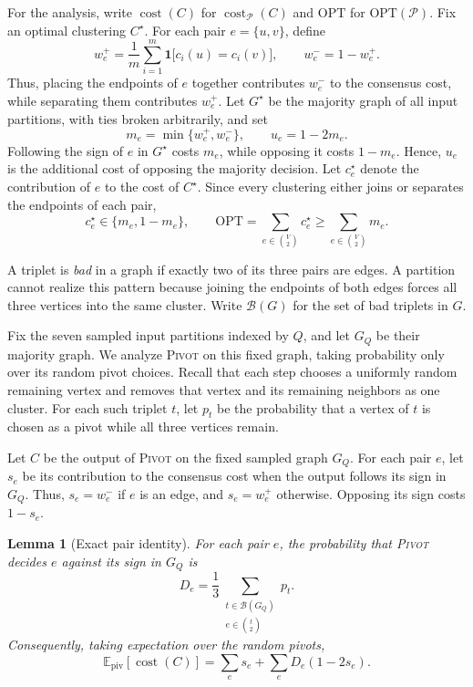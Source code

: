 \documentclass[11pt]{article}
\newtheorem{lemma}[theorem]{Lemma}
\theoremstyle{definition}
\theoremstyle{remark}
\newcommand{\1}{\mathbf{1}}
\begin{document}
For the analysis, write $\operatorname{cost}(C)$ for
$\operatorname{cost}_{\mathcal{P}}(C)$ and $\mathrm{OPT}$ for
$\mathrm{OPT}(\mathcal{P})$. Fix an optimal clustering $C^\star$. For each pair $e=\{u,v\}$, define
\[
    w_e^+
    = \frac{1}{m}\sum_{i=1}^{m}
      \mathbf{1}\bigl[c_i(u)=c_i(v)\bigr],
    \qquad
    w_e^- = 1-w_e^+.
\]
Thus, placing the endpoints of $e$ together contributes $w_e^-$
to the consensus cost, while separating them contributes $w_e^+$. Let $G^\star$ be the majority graph of all input partitions,
with ties broken arbitrarily, and set
\[
    m_e=\min\{w_e^+,w_e^-\},
    \qquad
    u_e=1-2m_e.
\]
Following the sign of $e$ in $G^\star$ costs $m_e$, while
opposing it costs $1-m_e$. Hence, $u_e$ is the additional cost
of opposing the majority decision. Let $c_e^\star$ denote the contribution of $e$ to the cost of
$C^\star$. Since every clustering either joins or separates
the endpoints of each pair,
\[
    c_e^\star\in\{m_e,1-m_e\},
    \qquad
    \mathrm{OPT}
    =\sum_{e\in\binom{V}{2}}c_e^\star
    \geq \sum_{e\in\binom{V}{2}}m_e.
\]

A triplet is \emph{bad} in a graph if exactly two of its three
pairs are edges. A partition cannot realize this pattern because
joining the endpoints of both edges forces all three vertices
into the same cluster. Write $\mathcal B(G)$ for the set of
bad triplets in $G$.

Fix the seven sampled input partitions indexed by $Q$, and let
$G_Q$ be their majority graph. We analyze \textsc{Pivot} on this
fixed graph, taking probability only over its random pivot choices.
Recall that each step chooses a uniformly random remaining vertex
and removes that vertex and its remaining neighbors as one cluster.
For each such triplet $t$, let $p_t$ be the probability that
a vertex of $t$ is chosen as a pivot while all three vertices remain.

Let $C$ be the output of \textsc{Pivot} on the fixed sampled graph
$G_Q$. For each pair $e$, let $s_e$ be its contribution to the
consensus cost when the output follows its sign in $G_Q$.
Thus, $s_e=w_e^-$ if $e$ is an edge, and $s_e=w_e^+$ otherwise.
Opposing its sign costs $1-s_e$.

\begin{lemma}[Exact pair identity]
\label{lem:pair-disagreement}
\label{lem:pair-cost}
For each pair $e$, the probability that \textsc{Pivot} decides
$e$ against its sign in $G_Q$ is
\[
    D_e
    = \frac{1}{3}
      \sum_{\substack{t\in\mathcal{B}(G_Q)\\
                      e\in\binom{t}{2}}} p_t.
\]
Consequently, taking expectation over the random pivots,
\[
    \mathbb{E}_{\mathrm{piv}}[\operatorname{cost}(C)]
    = \sum_e s_e+\sum_e D_e(1-2s_e).
\]
\end{lemma}
\end{document}
